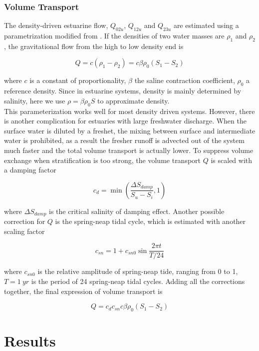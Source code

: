 \documentclass{article}
\begin{document}
\subsubsection{Volume Transport}
The density-driven estuarine flow, $Q_{02u}$, $Q_{12u}$ and $Q_{23u}$ are estimated using a parametrization modified from \citet{stommel1961thermohaline}. If the densities of two water masses are $\rho_1$ and $\rho_2$, the gravitational flow from the high to low density end is

\begin{equation}
Q = c(\rho_1-\rho_2) = c\beta\rho_0(S_1-S_2)
\label{eq:q}
\end{equation}

where $c$ is a constant of proportionality, $\beta$ the saline contraction coefficient, $\rho_0$ a reference density. Since in estuarine systems, density is mainly determined by salinity, here we use $\rho=\beta\rho_0S$ to approximate density. \\

This parameterization works well for most density driven systems. However, there is another complication for estuaries with large freshwater discharge. When the surface water is diluted by a freshet, the mixing between surface and intermediate water is prohibited, as a result the fresher runoff is advected out of the system much faster and the total volume transport is actually lower. To suppress volume exchange when stratification is too strong, the volume transport $Q$ is scaled with a damping factor

\begin{equation}
c_d = \min(\frac{\Delta S_{damp}}{S_u-S_i}, 1)
\label{eq:damp}
\end{equation}

where $\Delta S_{damp}$ is the critical salinity of damping effect. Another possible correction for $Q$ is the spring-neap tidal cycle, which is estimated with another scaling factor

\begin{equation}
c_{sn} = 1+c_{sn0}\sin\frac{2\pi t}{T/24}
\label{eq:sn}
\end{equation}

where $c_{sn0}$ is the relative amplitude of spring-neap tide, ranging from 0 to 1, $T=1~yr$ is the period of 24 spring-neap tidal cycles. Adding all the corrections together, the final expression of volume transport is

\begin{equation}
Q = c_{d}c_{sn}c\beta\rho_0(S_1-S_2)
\label{eq:q2}
\end{equation}


\section{Results}
\label{sec:results}




\end{document}
